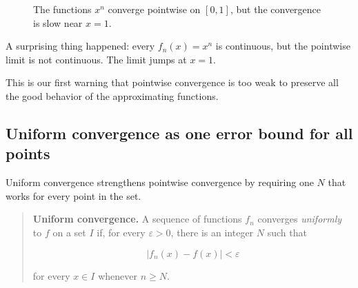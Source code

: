 \begin{figure}[h]
\centering
{}
\caption{The functions \(x^n\) converge pointwise on \([0,1]\), but the convergence is slow near \(x=1\).}
\label{fig:pointwise-xn}
\end{figure}

A surprising thing happened: every \(f_n(x)=x^n\) is continuous, but the pointwise
limit is not continuous.  The limit jumps at \(x=1\).

This is our first warning that pointwise convergence is too weak to preserve all the good
behavior of the approximating functions.

\subsection{Uniform convergence as one error bound for all points}
\label{subsec:uniform-convergence-one-error-bound}

Uniform convergence strengthens pointwise convergence by requiring one \(N\) that
works for every point in the set.

\begin{quote}
\textbf{Uniform convergence.}
A sequence of functions \(f_n\) converges \emph{uniformly} to \(f\) on a set \(I\) if, for
every \(\varepsilon>0\), there is an integer \(N\) such that

\[
|f_n(x)-f(x)|<\varepsilon
\]

for every \(x\in I\) whenever \(n\ge N\).
\end{quote}

